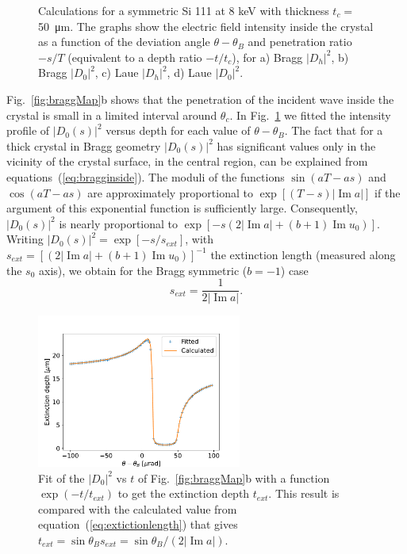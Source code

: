 \documentclass{iucr}
\begin{document}
\begin{figure}
    \caption{Calculations for a symmetric Si 111 at 8 keV with thickness $t_c=$\SI{50}{\micro\meter}. The graphs show the electric field intensity inside the crystal as a function of the 
    deviation angle $\theta-\theta_B$ and penetration ratio $-s/T$ (equivalent to a depth ratio $-t/t_c$), for
    a) Bragg $|D_h|^2$, b) Bragg $|D_0|^2$,
    c) Laue $|D_h|^2$, d) Laue $|D_0|^2$.
    }
\end{figure}

Fig.~\ref{fig:braggMap}b shows that the penetration of the incident wave inside the crystal is small in a limited interval around $\theta_c$.
In Fig.~\ref{fig:penetration} we fitted the intensity profile of $|D_0(s)|^2$ versus depth for each value of $\theta-\theta_B$.
The fact that for a thick crystal in Bragg geometry $|D_0(s)|^2$ has significant values only in the vicinity of the crystal surface, in the central region, can be explained from equations~(\ref{eq:bragginside}). The moduli of the functions $\sin(aT-as)$ and $\cos(aT-as)$ are approximately proportional to $\exp[(T-s)|\operatorname{Im}a|]$ if the argument of this exponential function is sufficiently large. Consequently, $|D_0(s)|^2$ is nearly proportional to $\exp[-s(2|\operatorname{Im}a|+(b+1)\operatorname{Im}u_0)]$. Writing $|D_0(s)|^2=\exp[-s/s_{ext}]$, with $s_{ext}=[(2|\operatorname{Im}a|+(b+1)\operatorname{Im}u_0)]^{-1}$ the extinction length (measured along the $s_0$ axis), we obtain for the Bragg symmetric ($b=-1$) case  
\begin{equation}\label{eq:extictionlength}
    s_{ext} = \frac{1}{2 |\operatorname{Im}a|}.
\end{equation}

\begin{figure}\label{fig:penetration}
    \centering
    \includegraphics[width=0.6\textwidth]{figures/penetration.pdf}

    \caption{Fit of the $|D_0|^2$ vs $t$ of Fig.~\ref{fig:braggMap}b with a function $\exp(-t/t_{ext})$ to get the extinction depth $t_{ext}$. This result is compared with the calculated value from equation~(\ref{eq:extictionlength}) that gives $t_{ext}=\sin\theta_B s_{ext} = \sin\theta_B/(2 |\operatorname{Im} a|)$.
    }
\end{figure}
\end{document}
